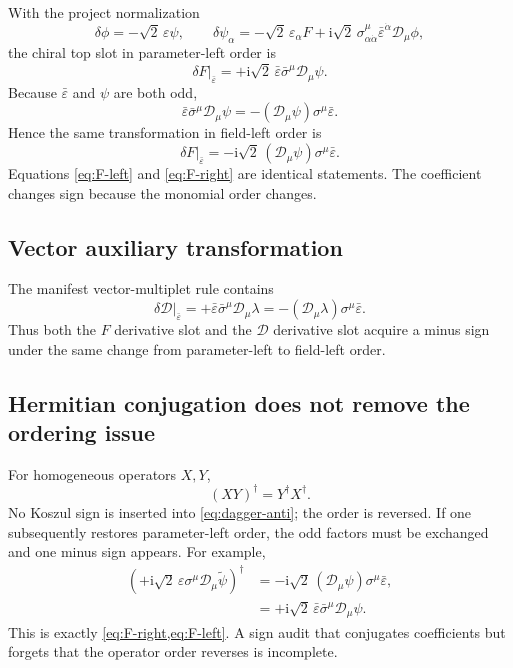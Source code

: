 \documentclass[11pt,a4paper,UTF8]{ctexart}
\numberwithin{equation}{section}
\newcommand{\ii}{\mathrm i}
\newcommand{\cD}{\mathcal D}
\newcommand{\eps}{\varepsilon}
\newcommand{\slot}{\big\vert}
\begin{document}
With the project normalization
\[
\delta\phi=-\sqrt2\,\eps\psi,
\qquad
\delta\psi_\alpha=-\sqrt2\,\eps_\alpha F
+\ii\sqrt2\,\sigma^\mu_{\alpha\dot\alpha}\bar\eps^{\dot\alpha}\cD_\mu\phi,
\]
the chiral top slot in parameter-left order is
\begin{equation}
\boxed{
\delta F\slot_{\bar\eps}
=+\ii\sqrt2\,\bar\eps\bar\sigma^\mu\cD_\mu\psi.}
\label{eq:F-left}
\end{equation}
Because $\bar\eps$ and $\psi$ are both odd,
\begin{equation}
\bar\eps\bar\sigma^\mu\cD_\mu\psi
=-(\cD_\mu\psi)\sigma^\mu\bar\eps.
\label{eq:koszul-spinor}
\end{equation}
Hence the same transformation in field-left order is
\begin{equation}
\boxed{
\delta F\slot_{\bar\eps}
=-\ii\sqrt2\,(\cD_\mu\psi)\sigma^\mu\bar\eps.}
\label{eq:F-right}
\end{equation}
Equations \eqref{eq:F-left} and \eqref{eq:F-right} are identical statements. The coefficient changes sign because the monomial order changes.

\subsection{Vector auxiliary transformation}

The manifest vector-multiplet rule contains
\begin{equation}
\boxed{
\delta\mathscr D\slot_{\bar\eps}
=+\bar\eps\bar\sigma^\mu\cD_\mu\lambda
=-(\cD_\mu\lambda)\sigma^\mu\bar\eps.}
\label{eq:D-orders}
\end{equation}
Thus both the $F$ derivative slot and the $\mathscr D$ derivative slot acquire a minus sign under the same change from parameter-left to field-left order.

\subsection{Hermitian conjugation does not remove the ordering issue}

For homogeneous operators $X,Y$,
\begin{equation}
(XY)^\dagger=Y^\dagger X^\dagger.
\label{eq:dagger-anti}
\end{equation}
No Koszul sign is inserted into \cref{eq:dagger-anti}; the order is reversed. If one subsequently restores parameter-left order, the odd factors must be exchanged and one minus sign appears. For example,
\begin{align}
\left(+\ii\sqrt2\,\eps\sigma^\mu\cD_\mu\widetilde\psi\right)^\dagger
&=-\ii\sqrt2\,(\cD_\mu\psi)\sigma^\mu\bar\eps,
\\
&=+\ii\sqrt2\,\bar\eps\bar\sigma^\mu\cD_\mu\psi.
\end{align}
This is exactly \cref{eq:F-right,eq:F-left}. A sign audit that conjugates coefficients but forgets that the operator order reverses is incomplete.
\end{document}
